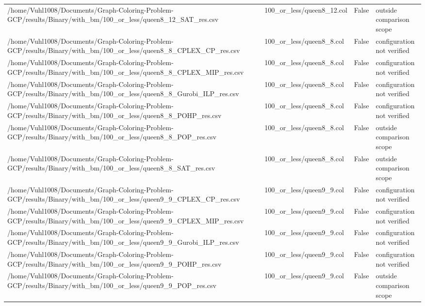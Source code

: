 \begin{table}[htbp]
\begin{tabular}{llll}
/home/Vuhl1008/Documents/Graph-Coloring-Problem-GCP/results/Binary/with\_bm/100\_or\_less/queen8\_12\_SAT\_res.csv & 100\_or\_less/queen8\_12.col & False & outside comparison scope \\
/home/Vuhl1008/Documents/Graph-Coloring-Problem-GCP/results/Binary/with\_bm/100\_or\_less/queen8\_8\_CPLEX\_CP\_res.csv & 100\_or\_less/queen8\_8.col & False & configuration not verified \\
/home/Vuhl1008/Documents/Graph-Coloring-Problem-GCP/results/Binary/with\_bm/100\_or\_less/queen8\_8\_CPLEX\_MIP\_res.csv & 100\_or\_less/queen8\_8.col & False & configuration not verified \\
/home/Vuhl1008/Documents/Graph-Coloring-Problem-GCP/results/Binary/with\_bm/100\_or\_less/queen8\_8\_Gurobi\_ILP\_res.csv & 100\_or\_less/queen8\_8.col & False & configuration not verified \\
/home/Vuhl1008/Documents/Graph-Coloring-Problem-GCP/results/Binary/with\_bm/100\_or\_less/queen8\_8\_POHP\_res.csv & 100\_or\_less/queen8\_8.col & False & configuration not verified \\
/home/Vuhl1008/Documents/Graph-Coloring-Problem-GCP/results/Binary/with\_bm/100\_or\_less/queen8\_8\_POP\_res.csv & 100\_or\_less/queen8\_8.col & False & outside comparison scope \\
/home/Vuhl1008/Documents/Graph-Coloring-Problem-GCP/results/Binary/with\_bm/100\_or\_less/queen8\_8\_SAT\_res.csv & 100\_or\_less/queen8\_8.col & False & outside comparison scope \\
/home/Vuhl1008/Documents/Graph-Coloring-Problem-GCP/results/Binary/with\_bm/100\_or\_less/queen9\_9\_CPLEX\_CP\_res.csv & 100\_or\_less/queen9\_9.col & False & configuration not verified \\
/home/Vuhl1008/Documents/Graph-Coloring-Problem-GCP/results/Binary/with\_bm/100\_or\_less/queen9\_9\_CPLEX\_MIP\_res.csv & 100\_or\_less/queen9\_9.col & False & configuration not verified \\
/home/Vuhl1008/Documents/Graph-Coloring-Problem-GCP/results/Binary/with\_bm/100\_or\_less/queen9\_9\_Gurobi\_ILP\_res.csv & 100\_or\_less/queen9\_9.col & False & configuration not verified \\
/home/Vuhl1008/Documents/Graph-Coloring-Problem-GCP/results/Binary/with\_bm/100\_or\_less/queen9\_9\_POHP\_res.csv & 100\_or\_less/queen9\_9.col & False & configuration not verified \\
/home/Vuhl1008/Documents/Graph-Coloring-Problem-GCP/results/Binary/with\_bm/100\_or\_less/queen9\_9\_POP\_res.csv & 100\_or\_less/queen9\_9.col & False & outside comparison scope \\

\end{tabular}
\end{table}
